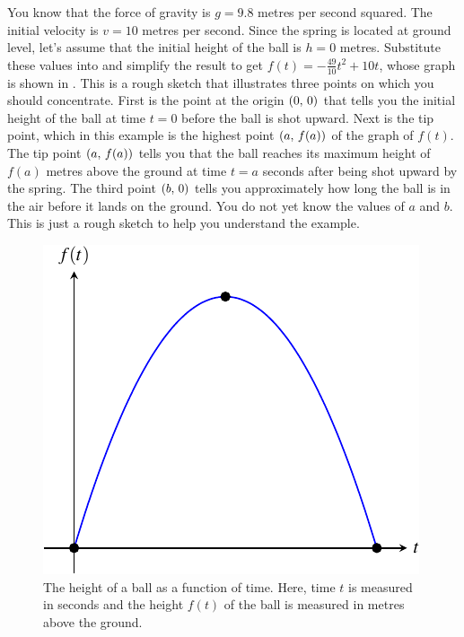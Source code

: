 \documentclass[a4paper,oneside,12pt]{article}
\begin{document}
\begin{solution}
You know that the force of gravity is $g = 9.8$ metres per second
squared.  The initial velocity is $v = 10$ metres per second.  Since
the spring is located at ground level, let's assume that the initial
height of the ball is $h = 0$ metres.  Substitute these values into
 and simplify the
result to get $f(t) = -\frac{49}{10}t^2 + 10t$, whose graph is shown
in .  This is a rough sketch that
illustrates three points on which you should concentrate.  First is
the point at the origin $\left\lparen{0},\, {0}\right\rparen$ that tells you the initial
height of the ball at time $t = 0$ before the ball is shot upward.
Next is the tip point, which in this example is the highest point
$\left\lparen{a},\, {f(a)}\right\rparen$ of the graph of $f(t)$.  The tip point
$\left\lparen{a},\, {f(a)}\right\rparen$ tells you that the ball reaches its maximum height
of $f(a)$ metres above the ground at time $t = a$ seconds after being
shot upward by the spring.  The third point $\left\lparen{b},\, {0}\right\rparen$ tells you
approximately how long the ball is in the air before it lands on the
ground.  You do not yet know the values of $a$ and $b$.  This is just
a rough sketch to help you understand the example.

\begin{figure}[!htbp]
\centering
\includegraphics[scale=1]{image/09/spring-ball.pdf}
\caption{%
  The height of a ball as a function of time.  Here, time $t$ is
  measured in seconds and the height $f(t)$ of the ball is measured in
  metres above the ground.
}
\label{fig:spring_ball_graph}
\end{figure}


\end{solution}
\end{document}
